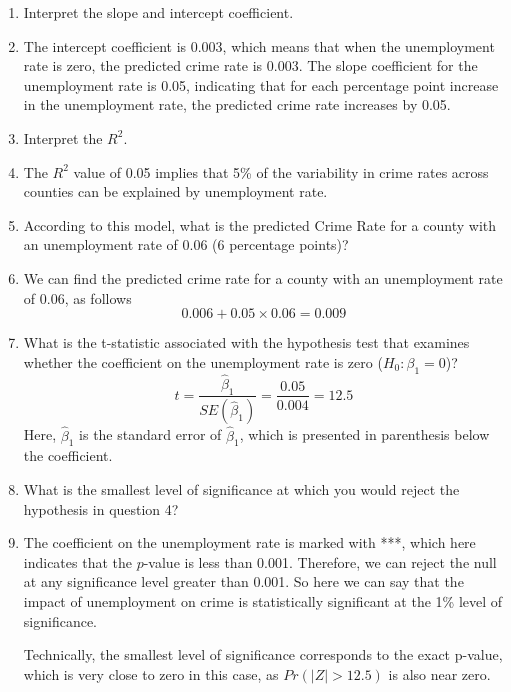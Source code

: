 \documentclass{./../../Latex/handout}
\begin{document}
\centering
 
\begin{enumerate}

	\item Interpret the slope and intercept coefficient.
	\item[] The intercept coefficient is 0.003, which means that when the unemployment rate is zero, the predicted crime rate is 0.003. The slope coefficient for the unemployment rate is 0.05, indicating that for each percentage point increase in the unemployment rate, the predicted crime rate increases by 0.05.
	
	\item Interpret the $R^2$.
	\item[] The \(R^2\) value of 0.05 implies that 5\% of the variability in crime rates across counties can be explained by unemployment rate.

	\item According to this model, what is the predicted Crime Rate for a county with an unemployment rate of 0.06 (6 percentage points)? 
	\item[]  We can find the predicted crime rate for a county with an unemployment rate of 0.06, as follows $$  0.006 + 0.05 \times 0.06 = 0.009 $$
	 
	\item What is the t-statistic associated with the hypothesis test that examines whether the coefficient on the unemployment rate is zero ($H_0: \beta_1 = 0$)?
	$$ t = \frac{\hat{\beta}_1}{SE(\hat{\beta}_1)} =  \frac{0.05}{0.004} = 12.5 $$
	Here, $\hat{\beta}_1$ is the standard error of $\hat{\beta}_1$, which is presented in parenthesis below the coefficient. 
	
	\item What is the smallest level of significance at which you would reject the hypothesis in question 4? 
	\item[] The coefficient on the unemployment rate is marked with ***, which here indicates that the $p$-value is less than 0.001. Therefore, we can reject the null at any significance level greater than 0.001. So here we can say that the impact of unemployment on crime is statistically significant at the 1\% level of significance. 
	
	Technically, the smallest level of significance corresponds to the exact p-value, which is very close to zero in this case, as \( Pr(|Z| > 12.5) \) is also near zero.
	

\end{enumerate}
\end{document}
